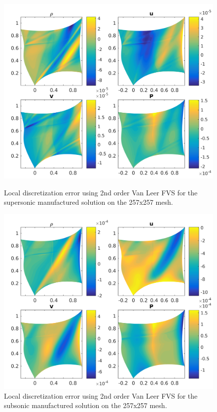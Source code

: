 \documentclass[]{aiaa-tc}%
\begin{document}
\begin{figure}[!htb]
  \centering
  \includegraphics[width=\linewidth]{figures/MMS_mesh6_SS_DE}
  \caption{Local discretization error using 2nd order Van Leer FVS for the supersonic manufactured solution on the 257x257 mesh.}
  \label{fig:DESS}
  \endminipage\hfill
  \centering
  \includegraphics[width=\linewidth]{figures/MMS_mesh6_SB_DE}
  \caption{Local discretization error using 2nd order Van Leer FVS for the subsonic manufactured solution on the 257x257 mesh.}
\label{fig:DESB}
  \endminipage\hfill
\end{figure}
\end{document}
